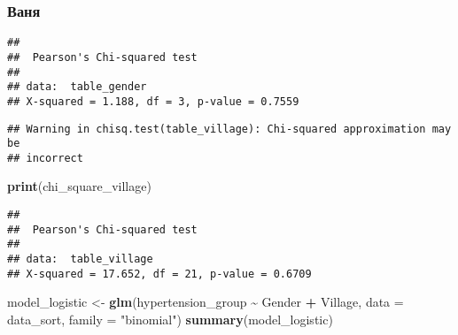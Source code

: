 \documentclass[
]{article}
\newenvironment{Shaded}{\begin{snugshade}}{\end{snugshade}}
\newcommand{\AttributeTok}[1]{\textcolor[rgb]{0.13,0.29,0.53}{#1}}
\newcommand{\FunctionTok}[1]{\textcolor[rgb]{0.13,0.29,0.53}{\textbf{#1}}}
\newcommand{\NormalTok}[1]{#1}
\newcommand{\OtherTok}[1]{\textcolor[rgb]{0.56,0.35,0.01}{#1}}
\newcommand{\SpecialCharTok}[1]{\textcolor[rgb]{0.81,0.36,0.00}{\textbf{#1}}}
\newcommand{\StringTok}[1]{\textcolor[rgb]{0.31,0.60,0.02}{#1}}
\begin{document}
\subsubsection{Ваня}\label{ux432ux430ux43dux44f}

\begin{Shaded}
\end{Shaded}

\begin{verbatim}
## 
##  Pearson's Chi-squared test
## 
## data:  table_gender
## X-squared = 1.188, df = 3, p-value = 0.7559
\end{verbatim}

\begin{Shaded}
\end{Shaded}

\begin{verbatim}
## Warning in chisq.test(table_village): Chi-squared approximation may be
## incorrect
\end{verbatim}

\begin{Shaded}
\begin{Highlighting}[]
\FunctionTok{print}\NormalTok{(chi\_square\_village)}
\end{Highlighting}
\end{Shaded}

\begin{verbatim}
## 
##  Pearson's Chi-squared test
## 
## data:  table_village
## X-squared = 17.652, df = 21, p-value = 0.6709
\end{verbatim}

\begin{Shaded}
\begin{Highlighting}[]
\NormalTok{model\_logistic }\OtherTok{\textless{}{-}} \FunctionTok{glm}\NormalTok{(hypertension\_group }\SpecialCharTok{\textasciitilde{}}\NormalTok{ Gender }\SpecialCharTok{+}\NormalTok{ Village, }\AttributeTok{data =}\NormalTok{ data\_sort, }\AttributeTok{family =} \StringTok{"binomial"}\NormalTok{)}
\FunctionTok{summary}\NormalTok{(model\_logistic)}
\end{Highlighting}
\end{Shaded}
\end{document}
